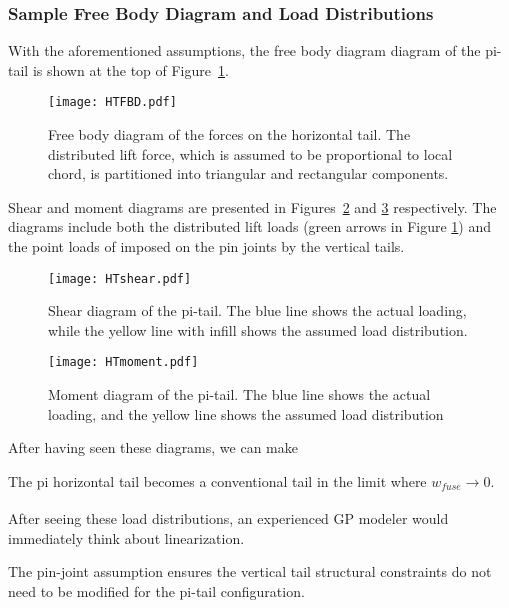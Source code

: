 \subsubsection{Sample Free Body Diagram and Load Distributions}
\label{s:loadDistributions}

With the aforementioned assumptions, the free body diagram diagram of the 
pi-tail is shown at the top of Figure~\ref{fig:HTFBD}. 

\begin{figure}[!ht]
\centering
\texttt{[image: HTFBD.pdf]}
\caption{Free body diagram of the forces on the horizontal tail. The distributed 
lift force, which is assumed to be proportional to local chord, is partitioned 
into triangular and rectangular components.}
\label{fig:HTFBD}
\end{figure}

Shear and moment diagrams are presented in Figures~\ref{fig:HTshear} and 
\ref{fig:HTmoment} respectively. The diagrams include both the distributed lift 
loads (green arrows in Figure \ref{fig:HTFBD}) and the point loads of imposed on 
the pin joints by the vertical tails.

\begin{figure}[!ht]
    \centering
    \texttt{[image: HTshear.pdf]}
    \caption{Shear diagram of the pi-tail. The blue line shows the actual 
loading, while the yellow line with infill shows the assumed load distribution.}
    \label{fig:HTshear}
\end{figure}

\begin{figure}[!ht]
    \centering
    \texttt{[image: HTmoment.pdf]}
    \caption{Moment diagram of the pi-tail. The blue line shows the actual 
loading, and the yellow line shows the assumed load distribution}
    \label{fig:HTmoment}
\end{figure}

After having seen these diagrams, we can make 

The pi horizontal tail becomes a conventional tail in the limit where $w_{fuse} \xrightarrow[]{} 0$. 


After seeing these load distributions, an experienced \gls{GP} modeler would immediately think about linearization. 



The pin-joint assumption ensures the vertical tail structural constraints do not 
need to be modified for the pi-tail configuration. 



